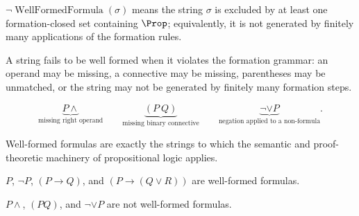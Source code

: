 \begin{remark*}
\(\neg \operatorname{WellFormedFormula}(\sigma)\) means the string \(\sigma\) is excluded by at least one formation-closed set containing \(\Prop\); equivalently, it is not generated by finitely many applications of the formation rules.
\end{remark*}

\begin{remark*}
A string fails to be well formed when it violates the formation grammar: an
operand may be missing, a connective may be missing, parentheses may be
unmatched, or the string may not be generated by finitely many formation steps.
\end{remark*}

\begin{remark*}
\[
\underbrace{P\land}_{\text{missing right operand}}
\qquad
\underbrace{(P\ Q)}_{\text{missing binary connective}}
\qquad
\underbrace{\neg\lor P}_{\text{negation applied to a non-formula}}.
\]
\end{remark*}

\begin{remark*}[Interpretation]
Well-formed formulas are exactly the strings to which the semantic and proof-theoretic machinery of propositional logic applies.
\end{remark*}

\begin{remark*}[Examples]
\(P\), \(\neg P\), \((P\to Q)\), and \((P\to(Q\lor R))\) are well-formed formulas.
\end{remark*}

\begin{remark*}
\(P\land\), \((P Q)\), and \(\neg\lor P\) are not well-formed formulas.
\end{remark*}

